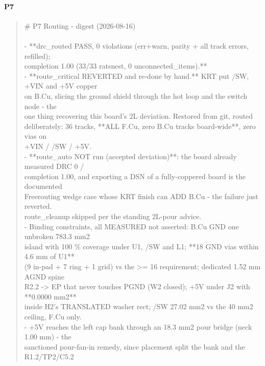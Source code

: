 \documentclass[11pt,a4paper]{article}
\begin{document}
\paragraph*{P7}
\begin{quote}\small\ttfamily\raggedright
\# P7 Routing - digest (2026-08-16)\\
~\\
- {*}{*}drc\_routed PASS, 0 violations (err+warn, parity + all track errors, refilled);\\
  completion 1.00 (33/33 ratsnest, 0 unconnected\_items).{*}{*}\\
- {*}{*}route\_critical REVERTED and re-done by hand.{*}{*} KRT put /SW, +VIN and +5V copper\\
  on B.Cu, slicing the ground shield through the hot loop and the switch node - the\\
  one thing recovering this board's 2L deviation. Restored from git, routed\\
  deliberately: 36 tracks, {*}{*}ALL F.Cu, zero B.Cu tracks board-wide{*}{*}, zero vias on\\
  +VIN / /SW / +5V.\\
- {*}{*}route\_auto NOT run (accepted deviation){*}{*}: the board already measured DRC 0 /\\
  completion 1.00, and exporting a DSN of a fully-coppered board is the documented\\
  Freerouting wedge case whose KRT finish can ADD B.Cu - the failure just reverted.\\
  route\_cleanup skipped per the standing 2L-pour advice.\\
- Binding constraints, all MEASURED not asserted: B.Cu GND one unbroken 783.3 mm2\\
  island with 100 \% coverage under U1, /SW and L1; {*}{*}18 GND vias within 4.6 mm of U1{*}{*}\\
  (9 in-pad + 7 ring + 1 grid) vs the \textgreater{}= 16 requirement; dedicated 1.52 mm AGND spine\\
  R2.2 -\textgreater{} EP that never touches PGND (W2 closed); +5V under J2 with {*}{*}0.0000 mm2{*}{*}\\
  inside H2's TRANSLATED washer rect; /SW 27.02 mm2 vs the 40 mm2 ceiling, F.Cu only.\\
- +5V reaches the left cap bank through an 18.3 mm2 pour bridge (neck 1.00 mm) - the\\
  sanctioned pour-fan-in remedy, since placement split the bank and the R1.2/TP2/C5.2\\

\end{quote}
\end{document}
